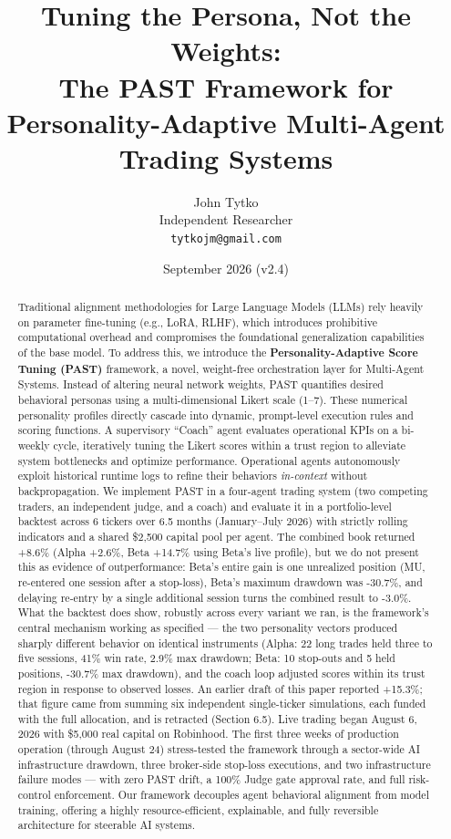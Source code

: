 \documentclass[11pt]{article}
\title{Tuning the Persona, Not the Weights:\\The PAST Framework for Personality-Adaptive Multi-Agent Trading Systems}
\author{John Tytko\\Independent Researcher\\\texttt{tytkojm@gmail.com}}
\date{September 2026 \quad (v2.4)}
\begin{document}
\maketitle

\begin{abstract}
Traditional alignment methodologies for Large Language Models (LLMs) rely heavily on parameter fine-tuning (e.g., LoRA, RLHF), which introduces prohibitive computational overhead and compromises the foundational generalization capabilities of the base model. To address this, we introduce the \textbf{Personality-Adaptive Score Tuning (PAST)} framework, a novel, weight-free orchestration layer for Multi-Agent Systems. Instead of altering neural network weights, PAST quantifies desired behavioral personas using a multi-dimensional Likert scale (1--7). These numerical personality profiles directly cascade into dynamic, prompt-level execution rules and scoring functions. A supervisory ``Coach'' agent evaluates operational KPIs on a bi-weekly cycle, iteratively tuning the Likert scores within a trust region to alleviate system bottlenecks and optimize performance. Operational agents autonomously exploit historical runtime logs to refine their behaviors \emph{in-context} without backpropagation. We implement PAST in a four-agent trading system (two competing traders, an independent judge, and a coach) and evaluate it in a portfolio-level backtest across 6 tickers over 6.5 months (January--July 2026) with strictly rolling indicators and a shared \$2,500 capital pool per agent. The combined book returned +8.6\% (Alpha +2.6\%, Beta +14.7\% using Beta's live profile), but we do not present this as evidence of outperformance: Beta's entire gain is one unrealized position (MU, re-entered one session after a stop-loss), Beta's maximum drawdown was -30.7\%, and delaying re-entry by a single additional session turns the combined result to -3.0\%. What the backtest does show, robustly across every variant we ran, is the framework's central mechanism working as specified --- the two personality vectors produced sharply different behavior on identical instruments (Alpha: 22 long trades held three to five sessions, 41\% win rate, 2.9\% max drawdown; Beta: 10 stop-outs and 5 held positions, -30.7\% max drawdown), and the coach loop adjusted scores within its trust region in response to observed losses. An earlier draft of this paper reported +15.3\%; that figure came from summing six independent single-ticker simulations, each funded with the full allocation, and is retracted (Section 6.5). Live trading began August 6, 2026 with \$5,000 real capital on Robinhood. The first three weeks of production operation (through August 24) stress-tested the framework through a sector-wide AI infrastructure drawdown, three broker-side stop-loss executions, and two infrastructure failure modes --- with zero PAST drift, a 100\% Judge gate approval rate, and full risk-control enforcement. Our framework decouples agent behavioral alignment from model training, offering a highly resource-efficient, explainable, and fully reversible architecture for steerable AI systems.
\end{abstract}
\end{document}
